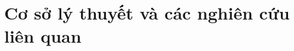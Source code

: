 \section{Cơ sở lý thuyết và các nghiên cứu liên quan}
\label{section3-background}

\lipsum
\lipsum
\lipsum